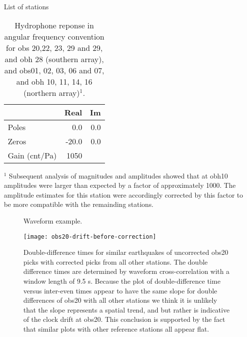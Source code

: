 \documentclass[reviewcopy]{elsart}
\renewcommand{\includegraphics}[2][]{\fbox{#2}}
\begin{document}
\begin{table}
\caption{List of stations}
\end{table}

\begin{table}
\caption{Hydrophone reponse in angular frequency convention for obs
  20,22, 23, 29 and 29, and obh 28 (southern array), and obs01, 02,
  03, 06 and 07, and obh 10, 11, 14, 16 (northern array)$^1$. }
\label{tbl:hyd-response}
\begin{center}
\begin{tabular}{lrr}
\hline
 & Real  & Im \\
\hline
Poles & 0.0   & 0.0 \\
Zeros & -20.0 & 0.0 \\
Gain (cnt/Pa) & 1050 & 
\end{tabular}
\end{center}
\footnotesize
$^1$ Subsequent analysis of magnitudes and amplitudes showed that at obh10 amplitudes
were larger than expected by a factor of approximately 1000.  The
amplitude estimates for this station were accordingly corrected by
this factor to be more compatible with the remainding stations. 
\end{table}

\begin{figure}
\centering
\caption{Waveform example.}
\label{figa:waveform}
\end{figure}


\begin{figure}
\centering
\texttt{[image: obs20-drift-before-correction]}
\caption{Double-difference times for similar earthquakes of uncorrected obs20 picks
with corrected picks from all other stations.  The double difference
times are determined by waveform cross-correlation with a window
length of 9.5 s.  Because the plot of double-difference time versus
inter-even times appear to have the same slope for double differences
of obs20 with all other stations we think it is unlikely that the slope
represents a spatial trend, and but rather is indicative of the clock
drift at obs20.  This conclusion is
supported by the fact that similar plots with other reference stations
all appear flat.}
\label{figa:obs20timing}
\end{figure}


\begin{figure}
\centering
\caption{}
\label{}
\end{figure}


\end{document}
